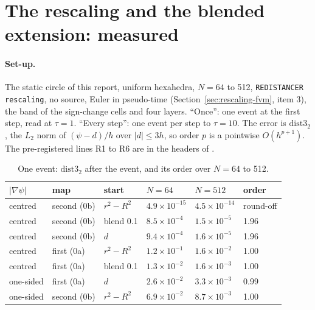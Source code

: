 \section{The rescaling and the blended extension: measured}
\label{sec:rescaling-results}

\paragraph{Set-up.} The static circle of this report, uniform hexahedra, $N=64$ to 512,
\texttt{REDISTANCER rescaling}, no source, Euler in pseudo-time (Section~\ref{sec:rescaling-fvm},
item 3), the band of the sign-change cells and four layers. ``Once'': one event at the first
step, read at $\tau=1$. ``Every step'': one event per step to $\tau=10$. The error is
$\mathrm{dist3}_2$, the $L_2$ norm of $(\psi-d)/h$ over $|d|\le3h$, so order $p$ is a pointwise
$O(h^{p+1})$. The pre-registered lines R1 to R6 are in the headers of
.

\begin{table}[h]\centering\small
\caption{One event: $\mathrm{dist3}_2$ after the event, and its order over $N=64$ to 512.
\Meas}
\label{tab:rescale-once}
\begin{tabular}{llllll}
\toprule
$|\nabla\psi|$ & map & start & $N=64$ & $N=512$ & order \\
\midrule
centred & second (0b) & $r^2-R^2$ & $4.9\times10^{-15}$ & $4.5\times10^{-14}$ & round-off \\
centred & second (0b) & blend 0.1 & $8.5\times10^{-4}$ & $1.5\times10^{-5}$ & 1.96 \\
centred & second (0b) & $d$ & $9.4\times10^{-4}$ & $1.6\times10^{-5}$ & 1.96 \\
centred & first (0a) & $r^2-R^2$ & $1.2\times10^{-1}$ & $1.6\times10^{-2}$ & 1.00 \\
centred & first (0a) & blend 0.1 & $1.3\times10^{-2}$ & $1.6\times10^{-3}$ & 1.00 \\
one-sided & first (0a) & $d$ & $2.6\times10^{-2}$ & $3.3\times10^{-3}$ & 0.99 \\
one-sided & second (0b) & $r^2-R^2$ & $6.9\times10^{-2}$ & $8.7\times10^{-3}$ & 1.00 \\
\bottomrule
\end{tabular}
\end{table}

